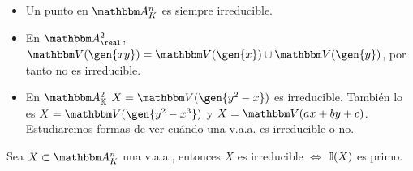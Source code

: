 \begin{example}
	\begin{itemize}
	\item Un punto en $\A_K^n$ es siempre irreducible.
	\item En $\A^2_{\real}$, $\V(\gen{xy})=\V(\gen{x}) \cup \V(\gen{y})$, por tanto no es irreducible.
	\item En $\A^2_{\K}$ $X=\V(\gen{y^2-x})$ es irreducible. También lo es $X=\V(\gen{y^2-x^3})$ y $X=\V(ax+by+c)$. Estudiaremos formas de ver cuándo una v.a.a. es irreducible o no.
	\end{itemize}
\end{example}

\begin{prop} \label{prop:VaaIrreducibleIdPrimo}
	Sea $X \subset \A_K^n$ una v.a.a., entonces $X$ es irreducible $\Leftrightarrow$ $\mathbb{I}(X)$ es primo.
\end{prop}

